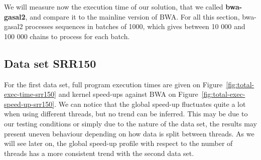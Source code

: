 We will measure now the execution time of our solution, that we called \textbf{bwa-gasal2}, and compare it to the mainline version of BWA. For all this section, bwa-gasal2 processes sequences in batches of 1000, which gives between 10 000 and 100 000 chains to process for each batch.

\subsection{Data set SRR150}

For the first data set, full program execution times are given on Figure~\ref{fig:total-exec-time-srr150} and kernel speed-ups against BWA on Figure~\ref{fig:total-exec-speed-up-srr150}. We can notice that the global speed-up fluctuates quite a lot when using different threads, but no trend can be inferred. This may be due to our testing conditions or simply due to the nature of the data set, the results may present uneven behaviour depending on how data is split between threads. As we will see later on, the global speed-up profile with respect to the number of threads has a more consistent trend with the second data set.

